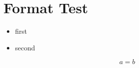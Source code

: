 \documentclass{article}
\begin{document}
  \section{Format Test}
  \begin{itemize}
    \item first
    \item second
  \end{itemize}
  \begin{equation}
    a=b
  \end{equation}
\end{document}
